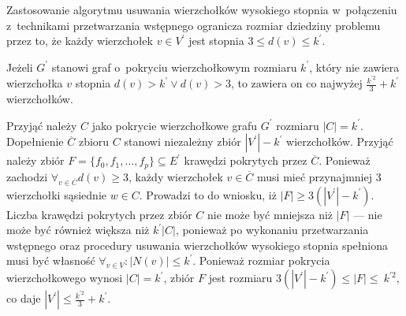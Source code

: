 Zastosowanie algorytmu usuwania wierzchołków wysokiego stopnia w~połączeniu z~technikami przetwarzania wstępnego ogranicza rozmiar dziedziny problemu przez
to, że każdy wierzchołek $v \in V^\prime$ jest stopnia $3 \leq d(v) \leq k^\prime$.

\begin{theorem}
  Jeżeli $G^\prime$ stanowi graf o~pokryciu wierzchołkowym rozmiaru $k^\prime$, który nie zawiera wierzchołka $v$ stopnia $d(v) > k^\prime \lor d(v) > 3$, to
  zawiera on co najwyżej $\frac{k^{\prime2}}{3} + k^\prime$ wierzchołków.
\end{theorem}
\begin{bproof}
  Przyjąć należy $C$ jako pokrycie wierzchołkowe grafu $G^\prime$ rozmiaru $|C|=k^\prime$.
  Dopełnienie $\overline{C}$ zbioru $C$ stanowi niezależny zbiór $|V^\prime|-k^\prime$ wierzchołków.
  Przyjąć należy zbiór $F=\{f_0,f_1, \ldots, f_p\} \subseteq E^\prime$ krawędzi pokrytych przez $\overline{C}$.
  Ponieważ zachodzi $\forall_{v \in \overline{C}}{d(v) \geq 3}$, każdy wierzchołek $v \in \overline{C}$ musi mieć przynajmniej 3 wierzchołki sąsiednie
  $w \in C$.
  Prowadzi to do wniosku, iż $|F| \geq 3(|V^\prime| - k^\prime)$.
  Liczba krawędzi pokrytych przez zbiór $C$ nie może być mniejsza niż $|F|$ --- nie może być również większa niż $k^\prime|C|$, ponieważ po wykonaniu przetwarzania wstępnego oraz procedury usuwania wierzchołków wysokiego stopnia spełniona musi być własność $\forall_{v \in V}:{|N(v)|\leq k^\prime}$.
  Ponieważ rozmiar pokrycia wierzchołkowego wynosi $|C|=k^\prime$, zbiór $F$ jest rozmiaru $3(|V^\prime|-k^\prime)\leq|F|\leq~k^{\prime2}$, co daje $|V^\prime|\leq\frac{k^{\prime2}}{3}+k^\prime$.
\end{bproof}